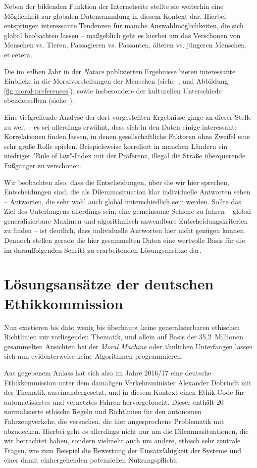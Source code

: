 \documentclass[twocolumn, german]{tum-article}
\begin{document}
Neben der bildenden Funktion der Internetseite stellte sie weiterhin eine Möglichkeit zur globalen Datensammlung in diesem Kontext dar.
Hierbei entspringen interessante Tendenzen für manche Auswahlmöglichkeiten, die sich global beobachten lassen -- maßgeblich geht es hierbei um das Verschonen von Menschen vs. Tieren, Passagieren vs. Passanten, älteren vs. jüngeren Menschen, et cetera.

Die im selben Jahr in der \emph{Nature} publizierten Ergebnisse bieten interessante Einblicke in die Moralvorstellungen der Menschen (siehe~\cite[S. 61]{moral-machine}, und Abbildung \vref{fig:moral-preferences}), sowie insbesondere der kulturellen Unterschiede ebenderselben (siehe~\cite[S. 62]{moral-machine}).

Eine tiefgreifende Analyse der dort vorgestellten Ergebnisse ginge an dieser Stelle zu weit -- es sei allerdings erwähnt, dass sich in den Daten einige interessante Korrelationen finden lassen, in denen gesellschaftliche Faktoren ohne Zweifel eine sehr große Rolle spielen.
Beispielsweise korreliert in manchen Ländern ein niedriger "Rule of law"-Index mit der Präferenz, illegal die Straße überquerende Fußgänger zu verschonen.

Wir beobachten also, dass die Entscheidungen, über die wir hier sprechen, Entscheidungen sind, die als Dilemmasituation klar individuelle Antworten sehen -- Antworten, die sehr wohl auch global unterschiedlich sein werden.
Sollte das Ziel des Unterfangens allerdings sein, eine gemeinsame Schiene zu fahren -- global generalisierbare Maximen und algorithmisch anwendbare Entscheidungskriterien zu finden -- ist deutlich, dass individuelle Antworten hier nicht genügen können. Dennoch stellen gerade die hier gesammelten Daten eine wertvolle Basis für die im darauffolgenden Schritt zu erarbeitenden Lösungsansätze dar.


\section{Lösungsansätze der deutschen Ethikkommission}
Nun existieren bis dato wenig bis überhaupt keine generalisierbaren ethischen Richtlinien zur vorliegenden Thematik, und allein auf Basis der 35,2~Millionen gesammelten Ansichten bei der \emph{Moral Machine} oder ähnlichen Unterfangen lassen sich nun evidenterweise keine Algorithmen programmieren.

Aus gegebenem Anlass hat sich also im Jahre 2016/17 eine deutsche Ethikkommission unter dem damaligen Verkehrsminister Alexander Dobrindt mit der Thematik auseinandergesetzt, und in diesem Kontext einen Ethik-Code für automatisiertes und vernetztes Fahren hervorgebracht.
Dieser enthält 20 normalisierte ethische Regeln und Richtlinien für den autonomen Fahrzeugverkehr, die versuchen, die hier angesprochene Problematik mit abzudecken.
Hierbei geht es allerdings nicht nur um die Dilemmasituationen, die wir betrachtet haben, sondern vielmehr auch um andere, ethisch sehr zentrale Fragen, wie zum Beispiel die Bewertung der Einsatzfähigkeit der Systeme und einer damit einhergehenden potenziellen Nutzungspflicht.
\end{document}
